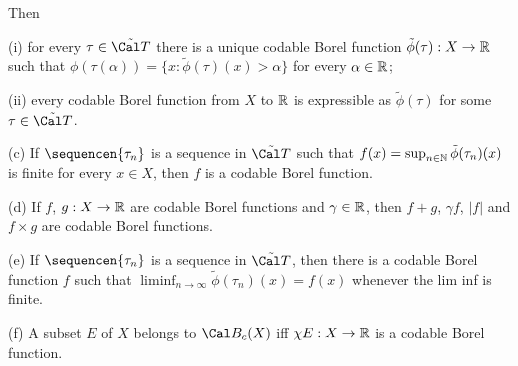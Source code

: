 \noindent Then

\quad(i) for every $\tau\in\tilde{\Cal T}$ there is a unique codable Borel
function $\tilde\phi(\tau):X\to\Bbb R$ such that
$\phi(\tau(\alpha))=\{x:\tilde\phi(\tau)(x)>\alpha\}$ for every
$\alpha\in\Bbb R$;

\quad(ii) every codable Borel function from $X$ to $\Bbb R$ is expressible
as $\tilde\phi(\tau)$ for some $\tau\in\tilde{\Cal T}$.

(c) If $\sequencen{\tau_n}$ is a sequence in $\tilde{\Cal T}$ such
that $f(x)=\sup_{n\in\Bbb N}\tilde\phi(\tau_n)(x)$ is finite for every
$x\in X$, then $f$ is a codable Borel function.

(d) If $f$, $g:X\to\Bbb R$ are codable Borel functions and
$\gamma\in\Bbb R$, then
$f+g$, $\gamma f$, $|f|$ and $f\times g$ are codable Borel functions.

(e) If $\sequencen{\tau_n}$ is a sequence in $\tilde{\Cal T}$, then there
is a codable Borel function $f$ such
that $\liminf_{n\to\infty}\tilde\phi(\tau_n)(x)=f(x)$ whenever the lim inf
is finite.

(f) A subset $E$ of $X$ belongs to $\Cal B_c(X)$ iff $\chi E:X\to\Bbb R$ is
a codable Borel function.

